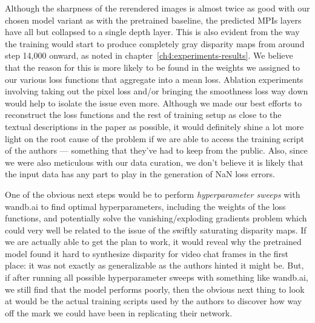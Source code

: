 Although the sharpness of the rerendered images is almost twice as good with our chosen model variant as with the pretrained baseline, the predicted MPIs layers have all but collapsed to a single depth layer. This is also evident from the way the training would start to produce completely gray disparity maps from around step 14,000 onward, as noted in chapter~\ref{ch4:experiments-results}. We believe that the reason for this is more likely to be found in the weights we assigned to our various loss functions that aggregate into a mean loss. Ablation experiments involving taking out the pixel loss and/or bringing the smoothness loss way down would help to isolate the issue even more. Although we made our best efforts to reconstruct the loss functions and the rest of training setup as close to the textual descriptions in the paper as possible, it would definitely shine a lot more light on the root cause of the problem if we are able to access the training script of the authors --- something that they've had to keep from the public. Also, since we were also meticulous with our data curation, we don't believe it is likely that the input data has any part to play in the generation of NaN loss errors.

One of the obvious next steps would be to perform \textit{hyperparameter sweeps} with wandb.ai to find optimal hyperparameters, including the weights of the loss functions, and potentially solve the vanishing/exploding gradients problem which could very well be related to the issue of the swiftly saturating disparity maps. If we are actually able to get the plan to work, it would reveal why the pretrained model found it hard to synthesize disparity for video chat frames in the first place: it was not exactly as generalizable as the authors hinted it might be. But, if after running all possible hyperparameter sweeps with something like wandb.ai, we still find that the model performs poorly, then the obvious next thing to look at would be the actual training scripts used by the authors to discover how way off the mark we could have been in replicating their network.


